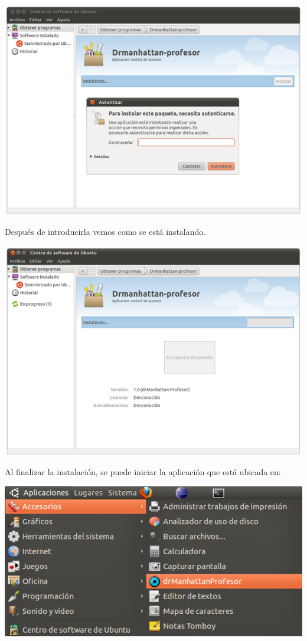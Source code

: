 \documentclass[a4paper,11pt]{article}
\begin{document}
\begin{center}

    \includegraphics[width=.90\linewidth]{imagenes/inst2}

\end{center}


Después de introducirla vemos como se está instalando.

\begin{center}

    \includegraphics[width=.90\linewidth]{imagenes/inst3}

\end{center}

Al finalizar la instalación, se puede iniciar la aplicación que está ubicada en:

\begin{center}

    \includegraphics[width=.90\linewidth]{imagenes/inst4}

\end{center}
\end{document}
